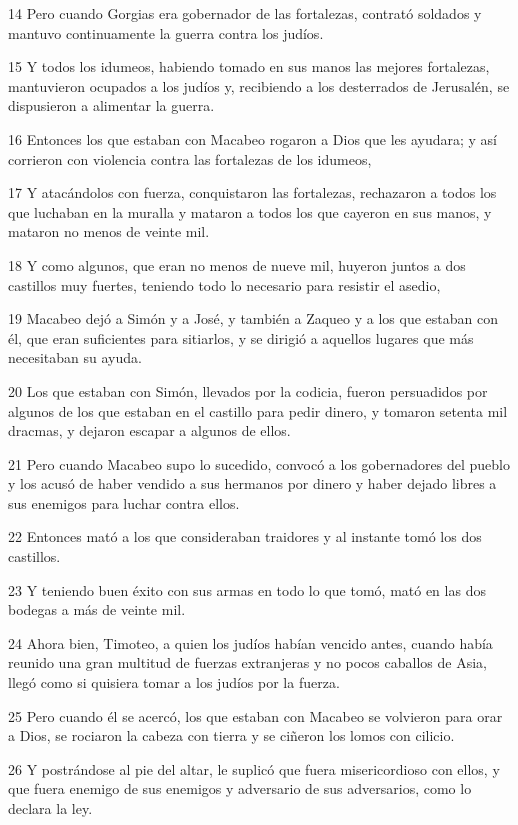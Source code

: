 \par 14 Pero cuando Gorgias era gobernador de las fortalezas, contrató soldados y mantuvo continuamente la guerra contra los judíos.
\par 15 Y todos los idumeos, habiendo tomado en sus manos las mejores fortalezas, mantuvieron ocupados a los judíos y, recibiendo a los desterrados de Jerusalén, se dispusieron a alimentar la guerra.
\par 16 Entonces los que estaban con Macabeo rogaron a Dios que les ayudara; y así corrieron con violencia contra las fortalezas de los idumeos,
\par 17 Y atacándolos con fuerza, conquistaron las fortalezas, rechazaron a todos los que luchaban en la muralla y mataron a todos los que cayeron en sus manos, y mataron no menos de veinte mil.
\par 18 Y como algunos, que eran no menos de nueve mil, huyeron juntos a dos castillos muy fuertes, teniendo todo lo necesario para resistir el asedio,
\par 19 Macabeo dejó a Simón y a José, y también a Zaqueo y a los que estaban con él, que eran suficientes para sitiarlos, y se dirigió a aquellos lugares que más necesitaban su ayuda.
\par 20 Los que estaban con Simón, llevados por la codicia, fueron persuadidos por algunos de los que estaban en el castillo para pedir dinero, y tomaron setenta mil dracmas, y dejaron escapar a algunos de ellos.
\par 21 Pero cuando Macabeo supo lo sucedido, convocó a los gobernadores del pueblo y los acusó de haber vendido a sus hermanos por dinero y haber dejado libres a sus enemigos para luchar contra ellos.
\par 22 Entonces mató a los que consideraban traidores y al instante tomó los dos castillos.
\par 23 Y teniendo buen éxito con sus armas en todo lo que tomó, mató en las dos bodegas a más de veinte mil.
\par 24 Ahora bien, Timoteo, a quien los judíos habían vencido antes, cuando había reunido una gran multitud de fuerzas extranjeras y no pocos caballos de Asia, llegó como si quisiera tomar a los judíos por la fuerza.
\par 25 Pero cuando él se acercó, los que estaban con Macabeo se volvieron para orar a Dios, se rociaron la cabeza con tierra y se ciñeron los lomos con cilicio.
\par 26 Y postrándose al pie del altar, le suplicó que fuera misericordioso con ellos, y que fuera enemigo de sus enemigos y adversario de sus adversarios, como lo declara la ley.
